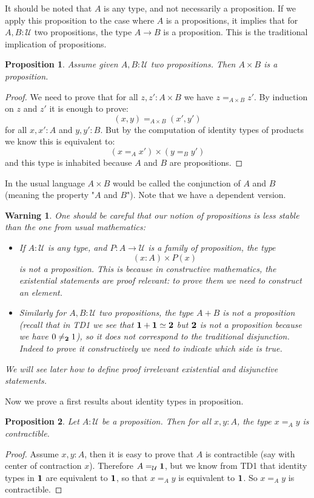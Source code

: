 \documentclass{article}
\newcommand{\U}{{\mathcal U}}
\renewcommand{\r}{\rightarrow}
\newcommand{\one}{{\bf 1}}
\newcommand{\two}{{\bf 2}}
\newtheorem{proposition}{Proposition}
\newtheorem{warning}{\danger Warning}
\begin{document}
It should be noted that $A$ is any type, and not necessarily a proposition. If we apply this proposition to the case where $A$ is a propositions, it implies that for $A,B:\U$ two propositions, the type $A\r B$ is a proposition. This is the traditional implication of propositions.

\begin{proposition}
Assume given $A,B:\U$ two propositions. Then $A\times B$ is a proposition.
\end{proposition}
\begin{proof}
We need to prove that for all $z,z':A\times B$ we have $z=_{A\times B} z'$. By induction on $z$ and $z'$ it is enough to prove:
\[(x,y)=_{A\times B}(x',y')\]
for all $x,x':A$ and $y,y':B$. But by the computation of identity types of products we know this is equivalent to:
\[(x=_Ax')\times (y=_By')\]
and this type is inhabited because $A$ and $B$ are propositions.
\end{proof}

In the usual language $A\times B$ would be called the conjunction of $A$ and $B$ (meaning the property "$A$ and $B$"). Note that we have a dependent version.

\begin{warning}
One should be careful that our notion of propositions is less stable than the one from usual mathematics:
\begin{itemize}
\item If $A:\U$ is any type, and $P:A\r \U$ is a family of proposition, the type
\[(x:A)\times P(x)\] 
is not a proposition. This is because in constructive mathematics, the existential statements are proof relevant: to prove them we need to construct an element. 
\item Similarly for $A,B:\U$ two propositions, the type $A+B$ is not a proposition (recall that in TD1 we see that $\one+\one\simeq\two$ but $\two$ is not a proposition because we have $0\neq_{\two}1$), so it does not correspond to the traditional disjunction. Indeed to prove it constructively we need to indicate which side is true.  
\end{itemize}
We will see later how to define proof irrelevant existential and disjunctive statements.
\end{warning}

Now we prove a first results about identity types in proposition.

\begin{proposition}
Let $A:\U$ be a proposition. Then for all $x,y:A$, the type $x=_Ay$ is contractible.
\end{proposition}
\begin{proof}
Assume $x,y:A$, then it is easy to prove that $A$ is contractible (say with center of contraction $x$). Therefore $A=_\U\one$, but we know from TD1 that identity types in $\one$ are equivalent to $\one$, so that $x=_A y$ is equivalent to $\one$. So $x=_Ay$  is contractible.
\end{proof}
\end{document}
